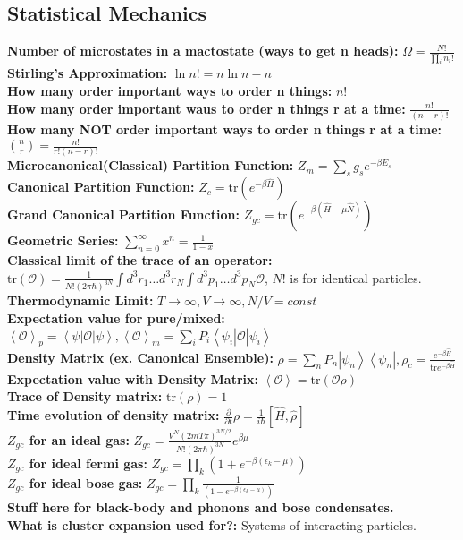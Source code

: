 \documentclass[12pt]{extarticle}
\newcommand{\ket}[1]{\left| #1 \right>}
\newcommand{\bra}[1]{\left< #1 \right|}
\begin{document}
\subsection{Statistical Mechanics}
\textbf{Number of microstates in a mactostate (ways to get n heads):} $\Omega = \frac{N!}{\prod_i n_i!}$ \\
\textbf{Stirling's Approximation:} $\ln n! = n\ln n - n$ \\
\textbf{How many order important ways to order n things:} $n!$ \\
\textbf{How many order important waus to order n things r at a time:} $\frac{n!}{(n-r)!}$ \\
\textbf{How many NOT order important ways to order n things r at a time:} $\binom{n}{r} = \frac{n!}{r!(n-r)!}$ \\
\textbf{Microcanonical(Classical) Partition Function:} $Z_m = \sum_s g_s e^{-\beta E_s}$ \\
\textbf{Canonical Partition Function:} $Z_c = \mathrm{tr}\left( e^{-\beta \hat{H}} \right)$ \\
\textbf{Grand Canonical Partition Function:} $Z_{gc} = \mathrm{tr}\left( e^{-\beta (\hat{H}-\mu\hat{N})} \right)$ \\
\textbf{Geometric Series:} $\sum\limits_{n=0}^\infty x^n = \frac{1}{1-x}$ \\
\textbf{Classical limit of the trace of an operator:} $\mathrm{tr}(\mathcal{O}) = \frac{1}{N!(2\pi\hbar)^{3N}} \int d^3r_1 \ldots d^3r_N \int d^3p_1 \ldots d^3p_N \mathcal{O}$, $N!$ is for identical particles. \\
\textbf{Thermodynamic Limit:} $T \rightarrow \infty, V \rightarrow \infty, N/V = const$ \\
\textbf{Expectation value for pure/mixed:} $\left<\mathcal{O}\right>_p = \bra{\psi}\mathcal{O}\ket{\psi}, \left<\mathcal{O}\right>_m = \sum_i P_i \bra{\psi_i}\mathcal{O}\ket{\psi_i}$ \\
\textbf{Density Matrix (ex. Canonical Ensemble):} $\rho = \sum_n P_n \ket{\psi_n}\bra{\psi_n}, \rho_{c} = \frac{e^{-\beta \hat{H}}}{\mathrm{tr}e^{-\beta\hat{H}}}$ \\
\textbf{Expectation value with Density Matrix:} $\left<\mathcal{O}\right> = \mathrm{tr}(\mathcal{O} \rho)$ \\
\textbf{Trace of Density matrix:} $\mathrm{tr}(\rho) = 1$ \\
\textbf{Time evolution of density matrix:} $\frac{\partial}{\partial t} \rho = \frac{1}{i\hbar}\left[\hat{H},\hat{\rho}\right]$ \\
\textbf{$Z_{gc}$ for an ideal gas:} $Z_{gc} = \frac{V^N(2mT\pi)^{3N/2}}{N!(2\pi\hbar)^{3N}} e^{\beta\mu}$ \\
\textbf{$Z_{gc}$ for ideal fermi gas:} $Z_{gc} = \prod\limits_k \left(1+e^{-\beta(\epsilon_k-\mu)}\right)$ \\
\textbf{$Z_{gc}$ for ideal bose gas:} $Z_{gc} = \prod\limits_k \frac{1}{\left(1-e^{-\beta(\epsilon_k-\mu)}\right)}$ \\
\textbf{Stuff here for black-body and phonons and bose condensates.} \\
\textbf{What is cluster expansion used for?:} Systems of interacting particles. \\
\end{document}
